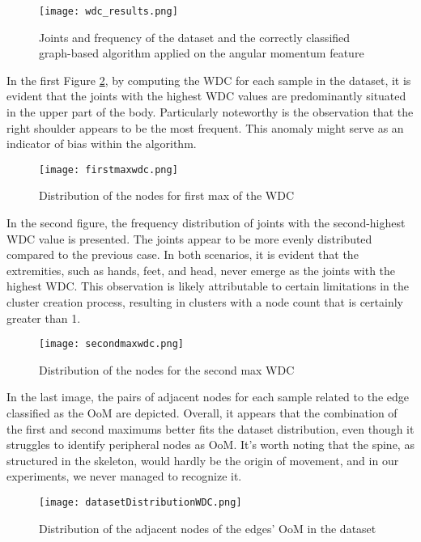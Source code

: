\begin{figure}[H]
  \centering
  \texttt{[image: wdc\_results.png]}
  \caption{Joints and frequency of the dataset and the correctly classified graph-based algorithm applied on the angular momentum feature}
  \label{fig:wdc_results}
\end{figure}

\clearpage

In the first Figure \ref{fig:firstmax_wdc}, by computing the WDC for each sample in the dataset, it is evident that the joints with the highest WDC values are predominantly situated in the upper part of the body. 
Particularly noteworthy is the observation that the right shoulder appears to be the most frequent.
This anomaly might serve as an indicator of bias within the algorithm.
\begin{figure}[H]
  \centering
  \texttt{[image: firstmaxwdc.png]}
  \caption{Distribution of the nodes for first max of the WDC}
  \label{fig:firstmax_wdc}
\end{figure}

In the second figure, the frequency distribution of joints with the second-highest WDC value is presented. 
The joints appear to be more evenly distributed compared to the previous case. 
In both scenarios, it is evident that the extremities, such as hands, feet, and head, never emerge as the joints with the highest WDC. 
This observation is likely attributable to certain limitations in the cluster creation process, resulting in clusters with a node count that is certainly greater than 1.

\begin{figure}[H]
  \centering
  \texttt{[image: secondmaxwdc.png]}
  \caption{Distribution of the nodes for the second max WDC}
  \label{fig:secondmax_wdc}
\end{figure}

In the last image, the pairs of adjacent nodes for each sample related to the edge classified as the OoM are depicted. 
Overall, it appears that the combination of the first and second maximums better fits the dataset distribution, even though it struggles to identify peripheral nodes as OoM. 
It's worth noting that the spine, as structured in the skeleton, would hardly be the origin of movement, and in our experiments, we never managed to recognize it.

\begin{figure}[H]
  \centering
  \texttt{[image: datasetDistributionWDC.png]}
  \caption{Distribution of the adjacent nodes of the edges' OoM in the dataset}
  \label{fig:datasetdistrib_wdc}
\end{figure}

